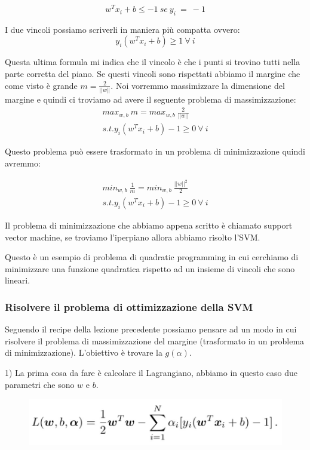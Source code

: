 \documentclass[14pt]{extreport}
\begin{document}
$$w^Tx_i+b \leq -1 \ se\ y_i\ =\ -1$$

I due vincoli possiamo scriverli in maniera più compatta ovvero: $$y_i(w^Tx_i+b)\geq 1 \ \forall \ i$$

Questa ultima formula mi indica che il vincolo è che i punti si trovino tutti nella parte corretta del piano. Se questi vincoli sono rispettati
abbiamo il margine che come visto è grande $m = \frac{2}{||w||}$. Noi vorremmo massimizzare la dimensione del margine e quindi ci troviamo ad avere il
seguente problema di massimizzazione:
\begin{align*}
	max_{w,b} \ m = max_{w,b} \ \frac{2}{||w||} \\
	s.t. y_i(w^Tx_i+b) - 1 \geq 0 \ \forall \ i
\end{align*}

Questo problema può essere trasformato in un problema di minimizzazione quindi avremmo:

\begin{align*}
	min_{w,b} \ \frac{1}{m} = min_{w,b} \ \frac{||w||^2}{2} \\
	s.t. y_i(w^Tx_i+b) - 1\geq 0 \ \forall \ i
\end{align*}


Il problema di minimizzazione che abbiamo appena scritto è chiamato support vector machine, se troviamo l'iperpiano allora abbiamo risolto l'SVM.

Questo è un esempio di problema di quadratic programming in cui cerchiamo di minimizzare una funzione quadratica rispetto ad un insieme di vincoli che
sono lineari.

\subsubsection{Risolvere il problema di ottimizzazione della SVM}

Seguendo il recipe della lezione precedente possiamo pensare ad un modo in cui risolvere il problema di massimizzazione del margine (trasformato in un
problema di minimizzazione). L'obiettivo è trovare la $g(\alpha)$.

1) La prima cosa da fare è calcolare il Lagrangiano, abbiamo in questo caso due parametri che sono $w$ e $b$.
\begin{figure}[H]
	\centering
	\includegraphics[width=0.7\linewidth]{315.jpeg}
\end{figure}
\end{document}
